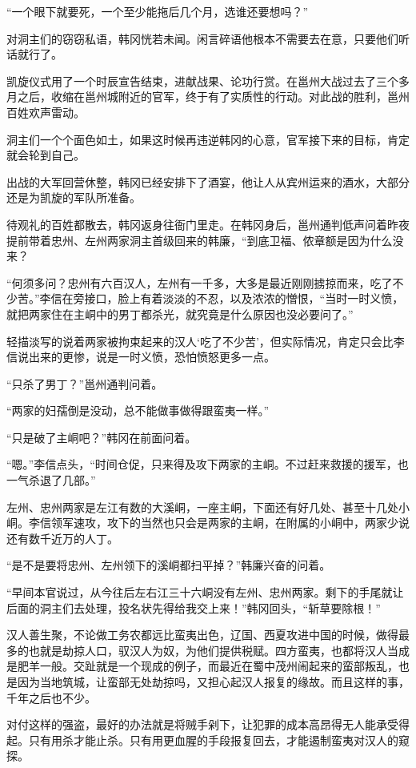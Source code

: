 “一个眼下就要死，一个至少能拖后几个月，选谁还要想吗？”

对洞主们的窃窃私语，韩冈恍若未闻。闲言碎语他根本不需要去在意，只要他们听话就行了。

凯旋仪式用了一个时辰宣告结束，进献战果、论功行赏。在邕州大战过去了三个多月之后，收缩在邕州城附近的官军，终于有了实质性的行动。对此战的胜利，邕州百姓欢声雷动。

洞主们一个个面色如土，如果这时候再违逆韩冈的心意，官军接下来的目标，肯定就会轮到自己。

出战的大军回营休整，韩冈已经安排下了酒宴，他让人从宾州运来的酒水，大部分还是为凯旋的军队所准备。

待观礼的百姓都散去，韩冈返身往衙门里走。在韩冈身后，邕州通判低声问着昨夜提前带着忠州、左州两家洞主首级回来的韩廉，“到底卫福、侬章额是因为什么没来？

“何须多问？忠州有六百汉人，左州有一千多，大多是最近刚刚掳掠而来，吃了不少苦。”李信在旁接口，脸上有着淡淡的不忍，以及浓浓的憎恨，“当时一时义愤，就把两家住在主峒中的男丁都杀光，就究竟是什么原因也没必要问了。”

轻描淡写的说着两家被拘束起来的汉人‘吃了不少苦’，但实际情况，肯定只会比李信说出来的更惨，说是一时义愤，恐怕愤怒更多一点。

“只杀了男丁？”邕州通判问着。

“两家的妇孺倒是没动，总不能做事做得跟蛮夷一样。”

“只是破了主峒吧？”韩冈在前面问着。

“嗯。”李信点头，“时间仓促，只来得及攻下两家的主峒。不过赶来救援的援军，也一气杀退了几部。”

左州、忠州两家是左江有数的大溪峒，一座主峒，下面还有好几处、甚至十几处小峒。李信领军速攻，攻下的当然也只会是两家的主峒，在附属的小峒中，两家少说还有数千近万的人丁。

“是不是要将忠州、左州领下的溪峒都扫平掉？”韩廉兴奋的问着。

“早间本官说过，从今往后左右江三十六峒没有左州、忠州两家。剩下的手尾就让后面的洞主们去处理，投名状先得给我交上来！”韩冈回头，“斩草要除根！”

汉人善生聚，不论做工务农都远比蛮夷出色，辽国、西夏攻进中国的时候，做得最多的也就是劫掠人口，驭汉人为奴，为他们提供税赋。四方蛮夷，也都将汉人当成是肥羊一般。交趾就是一个现成的例子，而最近在蜀中茂州闹起来的蛮部叛乱，也是因为当地筑城，让蛮部无处劫掠吗，又担心起汉人报复的缘故。而且这样的事，千年之后也不少。

对付这样的强盗，最好的办法就是将贼手剁下，让犯罪的成本高昂得无人能承受得起。只有用杀才能止杀。只有用更血腥的手段报复回去，才能遏制蛮夷对汉人的窥探。

